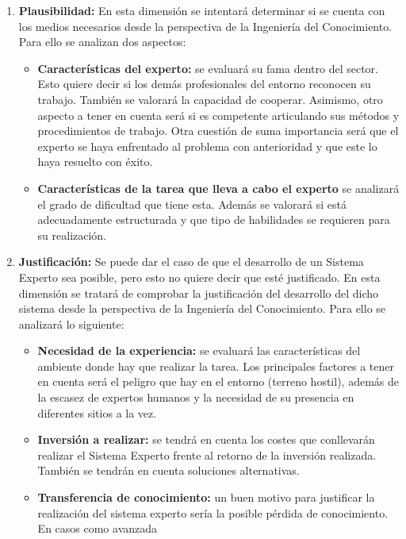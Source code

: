 \begin{enumerate}
  \item \textbf{Plausibilidad:} En esta dimensión se intentará determinar si se cuenta
  con los medios necesarios desde la perspectiva de la Ingeniería del Conocimiento.
  Para ello se analizan dos aspectos:
  \begin{itemize}
    \item \textbf{Características del experto:} se evaluará su fama dentro del sector.
      Esto quiere decir si los demás profesionales del entorno reconocen su trabajo. También
      se valorará la capacidad de cooperar. Asimismo, otro aspecto a tener en cuenta será
      si es competente articulando sus métodos y procedimientos de trabajo. Otra cuestión
      de suma importancia será que el experto se haya enfrentado al problema con anterioridad
      y que este lo haya resuelto con éxito.
    \item \textbf{Características de la tarea que lleva a cabo el experto} se analizará el
      grado de dificultad que tiene esta. Además se valorará si está adecuadamente estructurada
      y que tipo de habilidades se requieren para su realización.
  \end{itemize}
  \item \textbf{Justificación:} Se puede dar el caso de que el desarrollo de un Sistema Experto
    sea posible, pero esto no quiere decir que esté justificado. En esta dimensión se tratará
    de comprobar la justificación del desarrollo del dicho sistema desde la perspectiva de la
    Ingeniería del Conocimiento. Para ello se analizará lo siguiente:
    \begin{itemize}
      \item \textbf{Necesidad de la experiencia:} se evaluará las características del ambiente
        donde hay que realizar la tarea. Los principales factores a tener en cuenta será
        el peligro que hay en el entorno (terreno hostil), además de la escasez de expertos
        humanos y la necesidad de su presencia en diferentes sitios a la vez.
      \item \textbf{Inversión a realizar:} se tendrá en cuenta los costes que conllevarán
        realizar el Sistema Experto frente al retorno de la inversión realizada. También se
        tendrán en cuenta soluciones alternativas.
      \item \textbf{Transferencia de conocimiento:} un buen motivo para justificar la realización
        del sistema experto sería la posible pérdida de conocimiento. En casos como avanzada

\end{itemize}
\end{enumerate}
